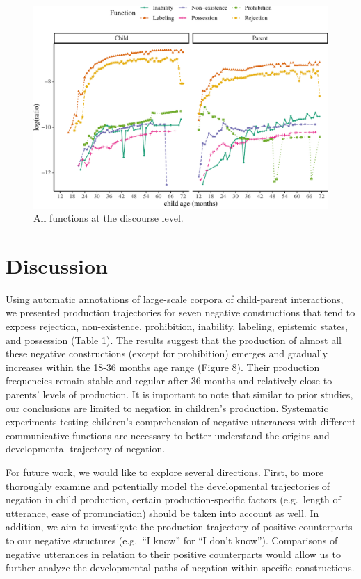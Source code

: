 \documentclass[
  english,
  man,floatsintext]{apa6}
\begin{document}
\begin{figure}[H]

{\centering \includegraphics{neg_construction_article_files/figure-latex/alldiscourse-1} 

}

\caption{All functions at the discourse level.}\label{fig:alldiscourse}
\end{figure}

\hypertarget{discussion}{%
\section{Discussion}\label{discussion}}

Using automatic annotations of large-scale corpora of child-parent interactions, we presented production trajectories for seven negative constructions that tend to express rejection, non-existence, prohibition, inability, labeling, epistemic states, and possession (Table 1). The results suggest that the production of almost all these negative constructions (except for prohibition) emerges and gradually increases within the 18-36 months age range (Figure 8). Their production frequencies remain stable and regular after 36 months and relatively close to parents' levels of production. It is important to note that similar to prior studies, our conclusions are limited to negation in children's production. Systematic experiments testing children's comprehension of negative utterances with different communicative functions are necessary to better understand the origins and developmental trajectory of negation.

For future work, we would like to explore several directions. First, to more thoroughly examine and potentially model the developmental trajectories of negation in child production, certain production-specific factors (e.g.~length of utterance, ease of pronunciation) should be taken into account as well. In addition, we aim to investigate the production trajectory of positive counterparts to our negative structures (e.g.~``I know'' for ``I don't know''). Comparisons of negative utterances in relation to their positive counterparts would allow us to further analyze the developmental paths of negation within specific constructions.
\end{document}
